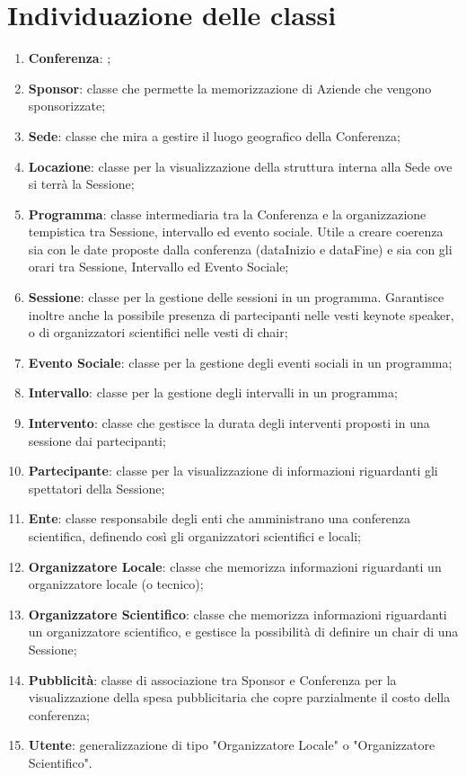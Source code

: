 \documentclass[a4paper,italian,10pt,openany]{book}
\begin{document}
	\section{Individuazione delle classi}
	\begin{enumerate}
	\item \textbf{Conferenza}: ;
	\item \textbf{Sponsor}: classe che permette la memorizzazione di Aziende che vengono sponsorizzate;
	\item \textbf{Sede}: classe che mira a gestire il luogo geografico della Conferenza;
	\item \textbf{Locazione}: classe per la visualizzazione della struttura interna alla Sede ove si terrà la Sessione;
	\item \textbf{Programma}: classe intermediaria tra la Conferenza e la organizzazione tempistica tra Sessione, intervallo ed evento sociale. Utile a creare coerenza sia con le date proposte dalla conferenza (dataInizio e dataFine) e sia con gli orari tra Sessione, Intervallo ed Evento Sociale;
	\item \textbf{Sessione}: classe per la gestione delle sessioni in un programma. Garantisce inoltre anche la possibile presenza di partecipanti nelle vesti keynote speaker, o di organizzatori scientifici nelle vesti di chair;
	\item \textbf{Evento Sociale}: classe per la gestione degli eventi sociali in un programma;
	\item \textbf{Intervallo}: classe per la gestione degli intervalli in un programma;
	\item \textbf{Intervento}: classe che gestisce la durata degli interventi proposti in una sessione dai partecipanti;
	\item \textbf{Partecipante}: classe per la visualizzazione di informazioni riguardanti gli spettatori della Sessione;
	\item \textbf{Ente}: classe responsabile degli enti che amministrano una conferenza scientifica, definendo così gli organizzatori scientifici e locali;
	\item \textbf{Organizzatore Locale}: classe che memorizza informazioni riguardanti un organizzatore locale (o tecnico);
	\item \textbf{Organizzatore Scientifico}: classe che memorizza informazioni riguardanti un organizzatore scientifico, e gestisce la possibilità di definire un chair di una Sessione;
	\item \textbf{Pubblicità}: classe di associazione tra Sponsor e Conferenza per la visualizzazione della spesa pubblicitaria che copre parzialmente il costo della conferenza;
	\item \textbf{Utente}: generalizzazione di tipo "Organizzatore Locale" o "Organizzatore Scientifico".
	\end{enumerate}
\end{document}
